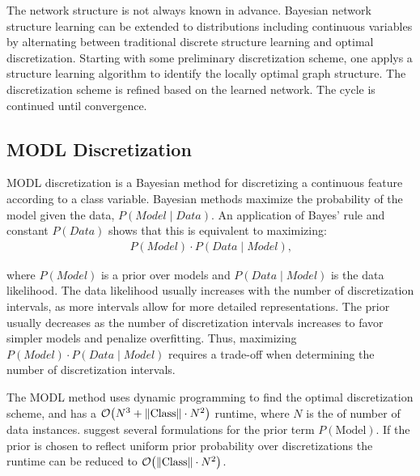 The network structure is not always known in advance. Bayesian network structure learning can be extended to distributions including continuous variables by alternating between traditional discrete structure learning and optimal discretization. Starting with some preliminary discretization scheme, one applys a structure learning algorithm to identify the locally optimal graph structure. The discretization scheme is refined based on the learned network. The cycle is continued until convergence.

\subsection{MODL Discretization}
MODL discretization \citep{Boulle_2006} is a Bayesian method for discretizing a continuous feature according to a class variable. Bayesian methods maximize the probability of the model given the data, $P(\textit{Model} \mid \textit{Data})$. An application of Bayes' rule and constant $P(\textit{Data})$ shows that this is equivalent to maximizing:
\begin{align}
P(\textit{Model}) \cdot P(\textit{Data} \mid \textit{Model})\text{,}
\end{align}

\noindent
where $P(\textit{Model})$ is a prior over models and $P(\textit{Data} \mid \textit{Model})$ is the data likelihood.
The data likelihood usually increases with the number of discretization intervals, as more intervals allow for more detailed representations.
The prior usually decreases as the number of discretization intervals increases to favor simpler models and penalize overfitting.
Thus, maximizing $P(\textit{Model}) \cdot P(\textit{Data} \mid \textit{Model})$ requires a trade-off when determining the number of discretization intervals.

The MODL method uses dynamic programming to find the optimal discretization scheme, and has a $\bigo\paren{N^3 + \|\text{Class}\| \cdot N^2}$ runtime, where $N$ is the of number of data instances. \cite{Lustgarten_2011} suggest several formulations for the prior term $P(\text{Model})$. If the prior is chosen to reflect uniform prior probability over discretizations the runtime can be reduced to $\bigo\paren{\|\text{Class}\| \cdot N^2}$.


